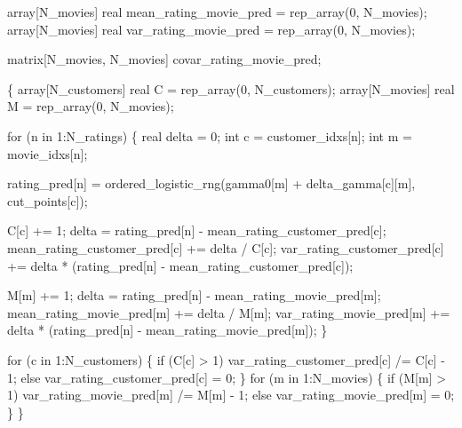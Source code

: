 \documentclass[
  letterpaper,
  DIV=11,
  numbers=noendperiod]{scrartcl}
\newenvironment{Shaded}{\begin{snugshade}}{\end{snugshade}}
\newcommand{\ControlFlowTok}[1]{\textcolor[rgb]{0.00,0.23,0.31}{#1}}
\newcommand{\DataTypeTok}[1]{\textcolor[rgb]{0.68,0.00,0.00}{#1}}
\newcommand{\DecValTok}[1]{\textcolor[rgb]{0.68,0.00,0.00}{#1}}
\newcommand{\NormalTok}[1]{\textcolor[rgb]{0.00,0.23,0.31}{#1}}
\begin{document}
\begin{codelisting}
\begin{Shaded}
\begin{Highlighting}[]
  \DataTypeTok{array}\NormalTok{[N\_movies] }\DataTypeTok{real}\NormalTok{ mean\_rating\_movie\_pred = rep\_array(}\DecValTok{0}\NormalTok{, N\_movies);}
  \DataTypeTok{array}\NormalTok{[N\_movies] }\DataTypeTok{real}\NormalTok{ var\_rating\_movie\_pred = rep\_array(}\DecValTok{0}\NormalTok{, N\_movies);}

  \DataTypeTok{matrix}\NormalTok{[N\_movies, N\_movies] covar\_rating\_movie\_pred;}

\NormalTok{  \{}
    \DataTypeTok{array}\NormalTok{[N\_customers] }\DataTypeTok{real}\NormalTok{ C = rep\_array(}\DecValTok{0}\NormalTok{, N\_customers);}
    \DataTypeTok{array}\NormalTok{[N\_movies] }\DataTypeTok{real}\NormalTok{ M = rep\_array(}\DecValTok{0}\NormalTok{, N\_movies);}

    \ControlFlowTok{for}\NormalTok{ (n }\ControlFlowTok{in} \DecValTok{1}\NormalTok{:N\_ratings) \{}
      \DataTypeTok{real}\NormalTok{ delta = }\DecValTok{0}\NormalTok{;}
      \DataTypeTok{int}\NormalTok{ c = customer\_idxs[n];}
      \DataTypeTok{int}\NormalTok{ m = movie\_idxs[n];}

\NormalTok{      rating\_pred[n]}
\NormalTok{        = ordered\_logistic\_rng(gamma0[m] + delta\_gamma[c][m],}
\NormalTok{                               cut\_points[c]);}

\NormalTok{      C[c] += }\DecValTok{1}\NormalTok{;}
\NormalTok{      delta = rating\_pred[n] {-} mean\_rating\_customer\_pred[c];}
\NormalTok{      mean\_rating\_customer\_pred[c] += delta / C[c];}
\NormalTok{      var\_rating\_customer\_pred[c]}
\NormalTok{        += delta * (rating\_pred[n] {-} mean\_rating\_customer\_pred[c]);}

\NormalTok{      M[m] += }\DecValTok{1}\NormalTok{;}
\NormalTok{      delta = rating\_pred[n] {-} mean\_rating\_movie\_pred[m];}
\NormalTok{      mean\_rating\_movie\_pred[m] += delta / M[m];}
\NormalTok{      var\_rating\_movie\_pred[m]}
\NormalTok{        += delta * (rating\_pred[n] {-} mean\_rating\_movie\_pred[m]);}
\NormalTok{    \}}

    \ControlFlowTok{for}\NormalTok{ (c }\ControlFlowTok{in} \DecValTok{1}\NormalTok{:N\_customers) \{}
      \ControlFlowTok{if}\NormalTok{ (C[c] \textgreater{} }\DecValTok{1}\NormalTok{)}
\NormalTok{        var\_rating\_customer\_pred[c] /= C[c] {-} }\DecValTok{1}\NormalTok{;}
      \ControlFlowTok{else}
\NormalTok{        var\_rating\_customer\_pred[c] = }\DecValTok{0}\NormalTok{;}
\NormalTok{    \}}
    \ControlFlowTok{for}\NormalTok{ (m }\ControlFlowTok{in} \DecValTok{1}\NormalTok{:N\_movies) \{}
      \ControlFlowTok{if}\NormalTok{ (M[m] \textgreater{} }\DecValTok{1}\NormalTok{)}
\NormalTok{        var\_rating\_movie\_pred[m] /= M[m] {-} }\DecValTok{1}\NormalTok{;}
      \ControlFlowTok{else}
\NormalTok{        var\_rating\_movie\_pred[m] = }\DecValTok{0}\NormalTok{;}
\NormalTok{    \}}
\NormalTok{  \}}


\end{Highlighting}
\end{Shaded}
\end{codelisting}
\end{document}

